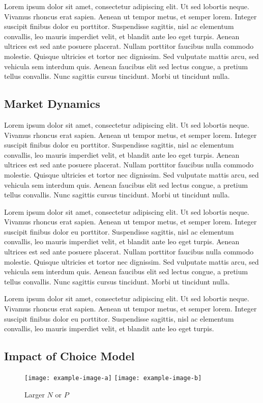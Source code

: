 Lorem ipsum dolor sit amet, consectetur adipiscing elit. Ut sed lobortis neque. Vivamus rhoncus erat sapien. Aenean ut tempor metus, et semper lorem. Integer suscipit finibus dolor eu porttitor. Suspendisse sagittis, nisl ac elementum convallis, leo mauris imperdiet velit, et blandit ante leo eget turpis. Aenean ultrices est sed ante posuere placerat. Nullam porttitor faucibus nulla commodo molestie. Quisque ultricies et tortor nec dignissim. Sed vulputate mattis arcu, sed vehicula sem interdum quis. Aenean faucibus elit sed lectus congue, a pretium tellus convallis. Nunc sagittis cursus tincidunt. Morbi ut tincidunt nulla.

\subsection{Market Dynamics}
Lorem ipsum dolor sit amet, consectetur adipiscing elit. Ut sed lobortis neque. Vivamus rhoncus erat sapien. Aenean ut tempor metus, et semper lorem. Integer suscipit finibus dolor eu porttitor. Suspendisse sagittis, nisl ac elementum convallis, leo mauris imperdiet velit, et blandit ante leo eget turpis. Aenean ultrices est sed ante posuere placerat. Nullam porttitor faucibus nulla commodo molestie. Quisque ultricies et tortor nec dignissim. Sed vulputate mattis arcu, sed vehicula sem interdum quis. Aenean faucibus elit sed lectus congue, a pretium tellus convallis. Nunc sagittis cursus tincidunt. Morbi ut tincidunt nulla.

Lorem ipsum dolor sit amet, consectetur adipiscing elit. Ut sed lobortis neque. Vivamus rhoncus erat sapien. Aenean ut tempor metus, et semper lorem. Integer suscipit finibus dolor eu porttitor. Suspendisse sagittis, nisl ac elementum convallis, leo mauris imperdiet velit, et blandit ante leo eget turpis. Aenean ultrices est sed ante posuere placerat. Nullam porttitor faucibus nulla commodo molestie. Quisque ultricies et tortor nec dignissim. Sed vulputate mattis arcu, sed vehicula sem interdum quis. Aenean faucibus elit sed lectus congue, a pretium tellus convallis. Nunc sagittis cursus tincidunt. Morbi ut tincidunt nulla.

Lorem ipsum dolor sit amet, consectetur adipiscing elit. Ut sed lobortis neque. Vivamus rhoncus erat sapien. Aenean ut tempor metus, et semper lorem. Integer suscipit finibus dolor eu porttitor. Suspendisse sagittis, nisl ac elementum convallis, leo mauris imperdiet velit, et blandit ante leo eget turpis. 

\subsection{Impact of Choice Model}
\begin{figure*}
    \centering 
    \texttt{[image: example-image-a]}
    \texttt{[image: example-image-b]}

    \caption{Larger $N$ or $P$}
\end{figure*}


